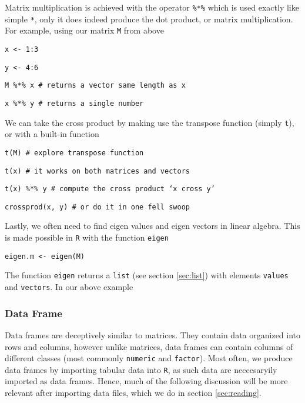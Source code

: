 \documentclass[12pt]{article}
\newcommand{\R}[1] {
	\item \texttt{#1}
}
\newenvironment{verbatim}{ 
	\indent
	\begin{list}{}{\setlength{\itemsep}{-1.5mm}}
}{
	\end{list}
}
\begin{document}
Matrix multiplication is achieved with the operator \texttt{\%*\%} which is used exactly like simple \verb+*+, only it does indeed produce the dot product, or matrix multiplication.  For example, using our matrix \verb+M+ from above
\begin{verbatim}
	\R{x <- 1:3}
	\R{y <- 4:6}
	\R{M \%*\% x	\# returns a vector same length as x}
	\R{x \%*\% y	\# returns a single number}
\end{verbatim}
We can take the cross product by making use the transpose function (simply \verb+t+), or with a built-in function
\begin{verbatim}
	\R{t(M)	\# explore transpose function}
	\R{t(x)	\# it works on both matrices and vectors}
	\R{t(x) \%*\% y	\# compute the cross product `x cross y'}
	\R{crossprod(x, y)	\# or do it in one fell swoop}
\end{verbatim}
Lastly, we often need to find eigen values and eigen vectors in linear algebra.  This is made possible in \verb+R+ with the function \verb+eigen+
\begin{verbatim}
	\R{eigen.m <- eigen(M)}
\end{verbatim}
The function \verb+eigen+ returns a \verb+list+ (see section \ref{sec:list}) with elements \verb+values+ and \verb+vectors+.  In our above example



\subsubsection{Data Frame}	\label{sec:data.frame}
Data frames are deceptively similar to matrices.  They contain data organized into rows and columns, however unlike matrices, data frames can contain columns of different classes (most commonly \verb+numeric+ and \verb+factor+).  Most often, we produce data frames by importing tabular data into \verb+R+, as such data are neccesaryily imported as data frames.  Hence, much of the following discussion will be more relevant after importing data files, which we do in section \ref{sec:reading}.
\end{document}
